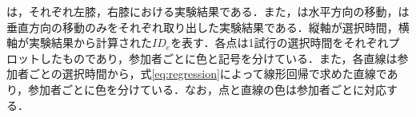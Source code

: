 \documentclass[submit, techrep]{ipsj}
\begin{document}
は，それぞれ左膝，右膝における実験結果である．また，は水平方向の移動，は垂直方向の移動のみをそれぞれ取り出した実験結果である．縦軸が選択時間，横軸が実験結果から計算された$ID_e$を表す．各点は1試行の選択時間をそれぞれプロットしたものであり，参加者ごとに色と記号を分けている．また，各直線は参加者ごとの選択時間から，式\ref{eq:regression}によって線形回帰で求めた直線であり，参加者ごとに色を分けている．なお，点と直線の色は参加者ごとに対応する．

\end{document}
